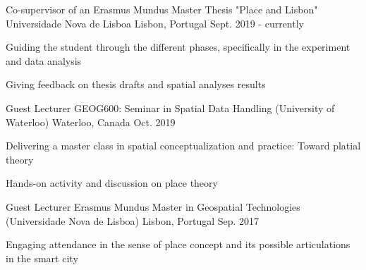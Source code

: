 

\begin{cventries}

  \cventry
    {Co-supervisor of an Erasmus Mundus Master Thesis "Place and Lisbon"} %
    {Universidade Nova de Lisboa} %
    {Lisbon, Portugal} %
    {Sept. 2019 - currently} %
    {  
        \begin{cvitems} %
            \item {Guiding the student through the different phases, specifically in the experiment and data analysis}
            \item {Giving feedback on thesis drafts and spatial analyses results}
        \end{cvitems}
    }


  \cventry
    {Guest Lecturer} %
    {GEOG600: Seminar in Spatial Data Handling (University of Waterloo)} %
    {Waterloo, Canada} %
    {Oct. 2019} %
    {
      \begin{cvitems} %
        \item {Delivering a master class in spatial conceptualization and practice: Toward platial theory}
        \item {Hands-on activity and discussion on place theory}
      \end{cvitems}
    }


  \cventry
    {Guest Lecturer} %
    {Erasmus Mundus Master in Geospatial Technologies (Universidade Nova de Lisboa)} %
    {Lisbon, Portugal} %
    {Sep. 2017} %
    {
      \begin{cvitems} %
        \item {Engaging attendance in the sense of place concept and its possible articulations in the smart city}
      \end{cvitems}
    }

\end{cventries}

